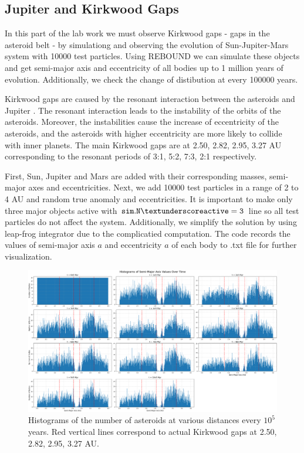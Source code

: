 \documentclass[12pt,a4paper]{article}
\begin{document}
\subsection{Jupiter and Kirkwood Gaps}

In this part of the lab work we must observe Kirkwood gaps - gaps in the asteroid belt - by simulationg and observing the evolution of Sun-Jupiter-Mars system with 10000 test particles. 
Using REBOUND we can simulate these objects and get semi-major axis and eccentricity of all bodies up to 1 million years of evolution. Additionally, we check the change of distibution at every 100000 years.

Kirkwood gaps are caused by the resonant interaction between the asteroids and Jupiter \cite{asteroids}. The resonant interaction leads to the instability of the orbits of the asteroids.
Moreover, the instabilities cause the increase of eccentricity of the asteroids, and the asteroids with higher eccentricity are more likely to collide with inner planets.
The main Kirkwood gaps are at 2.50, 2.82, 2.95, 3.27 AU corresponding to the resonant periods of 3:1, 5:2, 7:3, 2:1 respectively.

First, Sun, Jupiter and Mars are added with their corresponding masses, semi-major axes and eccentricities. 
Next, we add 10000 test particles in a range of 2 to 4 AU and random true anomaly and eccentricities. It is important to make only three major objects active with $\tt sim.N\textunderscore active=3$ line so all test particles do not affect the system. 
Additionally, we simplify the solution by using leap-frog integrator due to the complicatied computation. The code records the values of semi-major axis $a$ and eccentricity $a$ of each body to .txt file for further visualization.

\begin{figure}[ht]
  \centering
  \includegraphics[width=\linewidth]{kirkwood/hist_kirkwood.png}
  \caption{Histograms of the number of asteroids at various distances every $10^5$ years. Red vertical lines correspond to actual Kirkwood gaps at 2.50, 2.82, 2.95, 3.27 AU.}
  \label{fig:kirkwood_histogram}
\end{figure}
\end{document}
